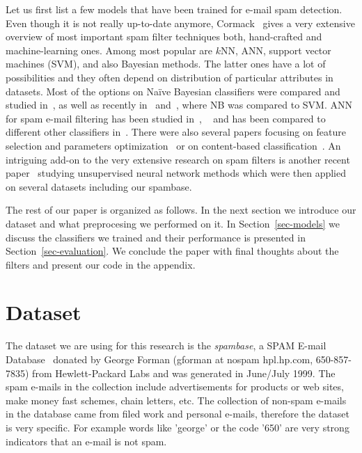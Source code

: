 \documentclass[11pt,a4paper]{article}
\begin{document}
Let us first list a few models that have been trained for e-mail spam detection. Even though it is not really up-to-date anymore, Cormack~\cite{Cormack-2006} gives a very extensive overview of most important spam filter techniques both, hand-crafted and machine-learning ones. Among most popular are $k$NN, ANN, support vector machines (SVM), and also Bayesian methods. The latter ones have a lot of possibilities and they often depend on distribution of particular attributes in datasets. Most of the options on Na\"ive Bayesian classifiers were compared and studied in~\cite{Metsis-2006}, as well as recently in~\cite{Eberhardt-2015} and~\cite{sah-2017}, where NB was compared to SVM. ANN for spam e-mail filtering has been studied in~\cite{puniskis-2006}, ~\cite{Idris-2011} and has been compared to different other classifiers in~\cite{deepa-2010}.
%
There were also several papers focusing on feature selection and parameters optimization~\cite{lee-2010} or on content-based classification~\cite{saab-2014}. An intriguing add-on to the very extensive research on spam filters is another recent paper~\cite{asadi-2017} studying unsupervised neural network methods which were then applied on several datasets including our spambase.




The rest of our paper is organized as follows. In the next section we introduce our dataset and what preprocesing we performed on it. In Section~\ref{sec-models} we discuss the classifiers we trained and their performance is presented in Section~\ref{sec-evaluation}. We conclude the paper with final thoughts about the filters and present our code in the appendix.

\section{Dataset}
\label{sec-data}

The dataset we are using for this research is the {\em spambase}, a SPAM E-mail Database~\cite{spambase} donated by George Forman (gforman at nospam hpl.hp.com, 650-857-7835) from Hewlett-Packard Labs and was generated in June/July 1999. 
The spam e-mails in the collection include advertisements for products or web sites, make money fast schemes, chain letters, etc. The collection of non-spam e-mails in the database came from filed work and personal e-mails, therefore the dataset is very specific. For example words like 'george' or the code '650' are very strong indicators that an e-mail is not spam. 
\end{document}
